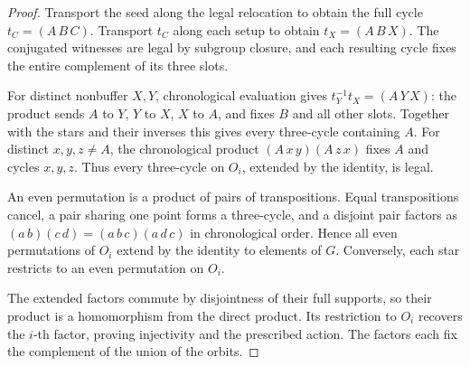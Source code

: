 %
%
\begin{proof}
  \leanok
  Transport the seed along the legal relocation to obtain the full
  cycle \(t_C=(A\,B\,C)\). Transport \(t_C\) along each setup to obtain
  \(t_X=(A\,B\,X)\). The conjugated witnesses are legal by subgroup
  closure, and each resulting cycle fixes the entire complement of
  its three slots.

  For distinct nonbuffer \(X,Y\), chronological evaluation gives
  \(t_Y^{-1}t_X=(A\,Y\,X)\): the product sends \(A\) to \(Y\), \(Y\) to
  \(X\), \(X\) to \(A\), and fixes \(B\) and all other slots. Together
  with the stars and their inverses this gives every three-cycle
  containing \(A\). For distinct \(x,y,z\ne A\), the chronological
  product \((A\,x\,y)(A\,z\,x)\) fixes \(A\) and cycles \(x,y,z\).
  Thus every three-cycle on \(O_i\), extended by the identity, is legal.

  An even permutation is a product of pairs of transpositions. Equal
  transpositions cancel, a pair sharing one point forms a three-cycle,
  and a disjoint pair factors as
  \((a\,b)(c\,d)=(a\,b\,c)(a\,d\,c)\) in chronological order.
  Hence all even permutations of \(O_i\) extend by the identity to
  elements of \(G\). Conversely, each star restricts to an even
  permutation on \(O_i\).

  The extended factors commute by disjointness of their full supports,
  so their product is a homomorphism from the direct product. Its
  restriction to \(O_i\) recovers the \(i\)-th factor, proving
  injectivity and the prescribed action. The factors each fix the
  complement of the union of the orbits.
\end{proof}

